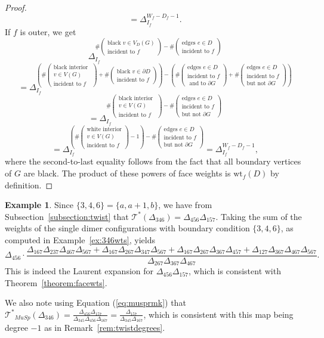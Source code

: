 \documentclass[11pt]{article}
\theoremstyle{definition}
\newtheorem{exam}[theo]{Example}
\numberwithin{equation}{section}
\def\T {{\mathscr{T}^*}}
\numberwithin{equation}{section}
\begin{document}
\begin{proof}
\[ =\Delta_{I_f}^{W_f-D_f-1}.\]
If $f$ is outer, 
we get
\[\Delta_{I_f}^{\#\left(\substack{\text{black }v \in V_D(G)\\\text{incident to }f}\right)-\#\left(\substack{\text{edges }e \in D\\\text{incident to }f}\right)}
\]\[=\Delta_{I_f}^{\left(\#\left(\substack{\text{black interior }\\v \in V(G)\\\text{incident to }f}\right)+\#\left(\substack{\text{black }v \in \partial D\\\text{incident to }f}\right)\right)-\left(\#\left(\substack{\text{edges }e \in D\\\text{incident to }f \\\text{~and~to~}\partial G}\right)+\#\left(\substack{\text{edges }e \in D\\\text{incident to }f\\\text{but not }\partial G}\right)\right)}\]
\[=\Delta_{I_f}^{\#\left(\substack{\text{black interior }\\v \in V(G)\\\text{incident to }f}\right)-\#\left(\substack{\text{edges }e \in D\\\text{incident to }f\\\text{but not }\partial G}\right)}\]
\[=\Delta_{I_f}^{\left(\#\left(\substack{\text{white interior}\\v \in V(G)\\\text{incident to }f}\right)-1\right)-\#\left(\substack{\text{edges }e \in D\\\text{incident to }f\\\text{but not }\partial G}\right)}=\Delta_{I_f}^{W_f-D_f-1},\]
where the second-to-last equality follows from the fact that all boundary vertices of $G$ are black.
The product of these powers of face weights is $\text{wt}_f(D)$ by definition.
\end{proof}


\begin{exam}
Since $\{3,4,6\}=\{a,a+1,b\}$, we have from Subsection~\ref{subsection:twist} that $\T(\Delta_{346})= \Delta_{456}\Delta_{157}.$ Taking the sum of the weights of the single dimer configurations with boundary condition $\{3,4,6\}$, as computed in Example~\ref{ex:346wts}, yields
{\small\[ \Delta_{456} \cdot \dfrac{\Delta_{167}\Delta_{237}\Delta_{467}\Delta_{567}+\Delta_{167}\Delta_{267}\Delta_{347}\Delta_{567} + \Delta_{167}\Delta_{267}\Delta_{367}\Delta_{457}+\Delta_{127}\Delta_{367}\Delta_{467}\Delta_{567}}{\Delta_{267}\Delta_{367}\Delta_{467}}.\]}
This is indeed the Laurent expansion for $\Delta_{456}\Delta_{157}$, which is consistent with Theorem~\ref{theorem:facewts}.

We also note using Equation (\ref{eq:musprmk}) that $\T_{MuSp}(\Delta_{346}) = \frac{\Delta_{456}\Delta_{157}}{\Delta_{345}\Delta_{456}\Delta_{167}}
= \frac{\Delta_{157}}{\Delta_{345}\Delta_{167}}$, which is consistent with this map being degree $-1$ as in Remark~\ref{rem:twistdegrees}.
\end{exam}
\end{document}
